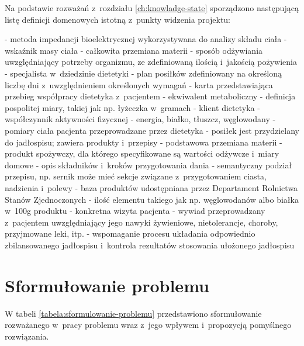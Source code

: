 Na podstawie rozważań z~rozdziału \ref{ch:knowladge-state} sporządzono następującą listę definicji domenowych istotną z~punkty widzenia projektu:
\begin{itemize}[series=atr, wide, align=left, leftmargin=190pt]
    - metoda impedancji bioelektrycznej wykorzystywana do analizy składu ciała
    - wskaźnik masy ciała
    - całkowita przemiana materii
    - sposób odżywiania uwzględniający potrzeby organizmu, ze zdefiniowaną ilością i~jakością pożywienia
    - specjalista w~dziedzinie dietetyki
    - plan posiłków zdefiniowany na określoną liczbę dni z~uwzględnieniem określonych wymagań
    - karta przedstawiająca przebieg współpracy dietetyka z~pacjentem
    - ekwiwalent metaboliczny
    - definicja pospolitej miary, takiej jak np. łyżeczka w~gramach
    - klient dietetyka
    - współczynnik aktywności fizycznej
    - energia, białko, tłuszcz, węglowodany
    - pomiary ciała pacjenta przeprowadzane przez dietetyka
    - posiłek jest przydzielany do jadłospisu; zawiera produkty i~przepisy
    - podstawowa przemiana materii
    - produkt spożywczy, dla którego specyfikowane są wartości odżywcze i~miary domowe
    - opis składników i~kroków przygotowania dania
    - semantyczny podział przepisu, np. sernik może mieć sekcje związane z~przygotowaniem ciasta, nadzienia i~polewy
    - baza produktów udostępniana przez Departament Rolnictwa Stanów Zjednoczonych
    - ilość elementu takiego jak np. węglowodanów albo białka w~100g produktu
    - konkretna wizyta pacjenta
    - wywiad przeprowadzany z~pacjentem uwzględniający jego nawyki żywieniowe, nietolerancje, choroby, przyjmowane leki, itp.
    - wspomaganie procesu układania odpowiednio zbilansowanego jadłospisu i~kontrola rezultatów stosowania ułożonego jadłospisu
\end{itemize}

\section{Sformułowanie problemu}\label{sec:problem-specification}

\par
W tabeli \ref{tabela:sformulowanie-problemu} przedstawiono sformułowanie rozważanego w~pracy problemu wraz z~jego wpływem i~propozycją pomyślnego rozwiązania.

